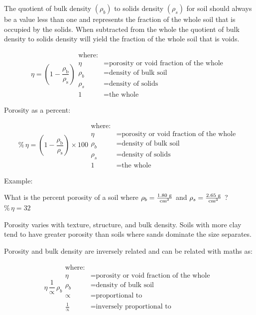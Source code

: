 \documentclass{book}
\begin{document}
The quotient of bulk density $\left(\rho_b\right)$ to solids density $\left(\rho_s\right)$ for soil should always be a value less than one and represents the fraction of the whole soil that is occupied by the solids. When subtracted from the whole the quotient of bulk density to solids density will yield the fraction of the whole soil that is voids.

\begin{equation}
    \eta =\left(1-\frac{\rho_{\text{b}}}{\rho_{\text{s}}}\right)
    \begin{aligned}
        \text{where:}\\
        \eta &= \text{porosity or void fraction of the whole }\\
        \rho_b &= \text{density of bulk soil}\\
        \rho_s &= \text{density of solids}\\
        1 &= \text{the whole}
    \end{aligned}
\end{equation}

Porosity as a percent:

\begin{equation}
    \%\,\eta =\left(1-\frac{\rho_{\text{b}}}{\rho_{\text{s}}}\right) \times 100
    \begin{aligned}
        \text{where:}\\
        \eta &= \text{porosity or void fraction of the whole }\\
        \rho_b &= \text{density of bulk soil}\\
        \rho_s &= \text{density of solids}\\
        1 &= \text{the whole}
    \end{aligned}
\end{equation}

Example:

What is the percent porosity of a soil where $\rho_b = \ce{\frac{1.80\,g}{cm^3}}$ and $\rho_s = \ce{\frac{2.65\,g}{cm^3}}$ ? $\%\,\eta = 32$

Porosity varies with texture, structure, and bulk density. Soils with more clay tend to have greater porosity than soils where sands dominate the size separates.

Porosity and bulk density are inversely related and can be related with maths as:

\begin{equation}
    \eta \, \frac{1}{\propto} \, \rho_b
    \begin{aligned}
        \text{where:}\\
        \eta &= \text{porosity or void fraction of the whole }\\
        \rho_b &= \text{density of bulk soil}\\
        \propto &= \text{proportional to}\\
        \frac{1}{\propto} &= \text{inversely proportional to}
    \end{aligned}
\end{equation}
\end{document}
